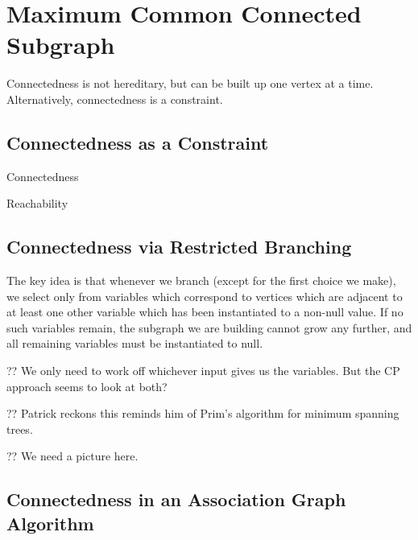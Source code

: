 \documentclass{llncs}
\begin{document}
\section{Maximum Common Connected Subgraph}

Connectedness is not hereditary, but can be built up one vertex at a time. Alternatively,
connectedness is a constraint.

\subsection{Connectedness as a Constraint}

Connectedness \cite{Brown:2005}

Reachability \cite{DBLP:conf/cp/DoomsDD05,DBLP:conf/cp/QuesadaRD05}

\subsection{Connectedness via Restricted Branching}

The key idea is that whenever we branch (except for the first choice we make), we select only from
variables which correspond to vertices which are adjacent to at least one other variable which has
been instantiated to a non-null value. If no such variables remain, the subgraph we are building
cannot grow any further, and all remaining variables must be instantiated to null.

?? We only need to work off whichever input gives us the variables. But the CP approach seems to
look at both?

?? Patrick reckons this reminds him of Prim's algorithm for minimum spanning trees.

?? We need a picture here.

\subsection{Connectedness in an Association Graph Algorithm}
\end{document}
